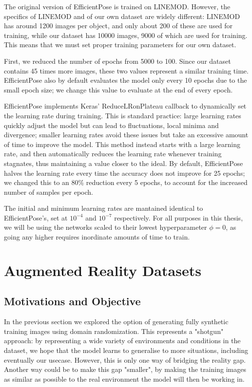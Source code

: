 The original version of EfficientPose is trained on LINEMOD. However, the specifics of LINEMOD and of our own dataset are widely different: LINEMOD has around 1200 images per object, and only about 200 of these are used for training, while our dataset has 10000 images, 9000 of which are used for training. This means that we must set proper training parameters for our own dataset.

First, we reduced the number of epochs from 5000 to 100. Since our dataset contains 45 times more images, these two values represent a similar training time. EfficientPose also by default evaluates the model only every 10 epochs due to the small epoch size; we change this value to evaluate at the end of every epoch.

EfficientPose implements Keras' ReduceLRonPlateau callback to dynamically set the learning rate during training. This is standard practice: large learning rates quickly adjust the model but can lead to fluctuations, local minima and divergence; smaller learning rates avoid these issues but take an excessive amount of time to improve the model\cite{ReduceLR}. This method instead starts with a large learning rate, and then automatically reduces the learning rate whenever training stagnates, thus maintaining a value closer to the ideal. By default, EfficientPose halves the learning rate every time the accuracy does not improve for 25 epochs; we changed this to an 80\% reduction every 5 epochs, to account for the increased number of samples per epoch.

The initial and minimum learning rates are mantained identical to EfficientPose's, set at $10^{-4}$ and $10^{-7}$ respectively. For all purposes in this thesis, we will be using the networks scaled to their lowest hyperparameter $\phi = 0$, as going any higher requires inordinate amounts of time to train.

\section{Augmented Reality Datasets}

\subsection{Motivations and Objective}

In the previous section we explored the option of generating fully synthetic training images using domain randomization. This represents a "shotgun" approach: by representing a wide variety of environments and conditions in the dataset, we hope that the model learns to generalise to more situations, including eventually our usecase. However, this is only one way of bridging the reality gap. Another way could be to make this gap "smaller", by making the training images as similar as possible to the real environment the model will then be working in.

